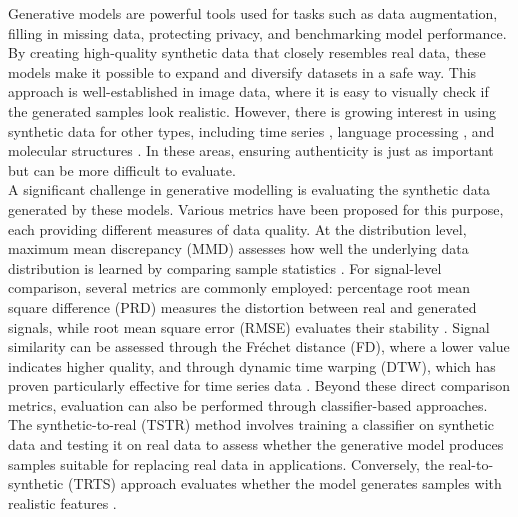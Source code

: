 Generative models are powerful tools used for tasks such as data augmentation, filling in missing data, protecting privacy, and benchmarking model performance. By creating high-quality synthetic data that closely resembles real data, these models make it possible to expand and diversify datasets in a safe way. This approach is well-established in image data, where it is easy to visually check if the generated samples look realistic. However, there is growing interest in using synthetic data for other types, including time series \cite{mogrenCRNNGANContinuousRecurrent2016, estebanRealvaluedMedicalTime2017, yuSeqGANSequenceGenerative2017, kongDiffWaveVersatileDiffusion2021}, language processing \cite{yuSeqGANSequenceGenerative2017, liAdversarialLearningNeural2017}, and molecular structures \cite{hawkins-hookerGeneratingFunctionalProtein2021, repeckaExpandingFunctionalProtein2021}. In these areas, ensuring authenticity is just as important but can be more difficult to evaluate.
\\ 
A significant challenge in generative modelling is evaluating the synthetic data generated by these models. Various metrics have been proposed for this purpose, each providing different measures of data quality. At the distribution level, maximum mean discrepancy (MMD) assesses how well the underlying data distribution is learned by comparing sample statistics \cite{estebanRealvaluedMedicalTime2017}. For signal-level comparison, several metrics are commonly employed: percentage root mean square difference (PRD) measures the distortion between real and generated signals, while root mean square error (RMSE) evaluates their stability \cite{zhuElectrocardiogramGenerationBidirectional2019}. Signal similarity can be assessed through the Fréchet distance (FD), where a lower value indicates higher quality, and through dynamic time warping (DTW), which has proven particularly effective for time series data \cite{zhuElectrocardiogramGenerationBidirectional2019, delaneySynthesisRealisticECG2019, serraEmpiricalEvaluationSimilarity2014}. Beyond these direct comparison metrics, evaluation can also be performed through classifier-based approaches. The synthetic-to-real (TSTR) method involves training a classifier on synthetic data and testing it on real data to assess whether the generative model produces samples suitable for replacing real data in applications. Conversely, the real-to-synthetic (TRTS) approach evaluates whether the model generates samples with realistic features \cite{estebanRealvaluedMedicalTime2017}.
